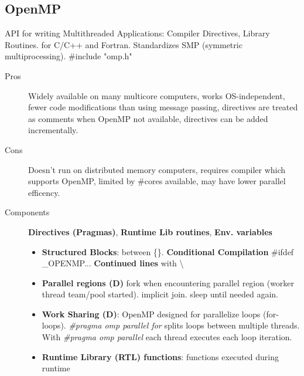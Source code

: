 \subsection*{OpenMP}
API for writing Multithreaded Applications: Compiler Directives, Library Routines. for C/C++ and Fortran. Standardizes SMP (symmetric multiprocessing). #include "omp.h"
\begin{description}
    \item[Pros] Widely available on many multicore computers, works OS-independent, fewer code modifications than using message passing, directives are treated as comments when OpenMP not available, directives can be added incrementally.
    \item[Cons] Doesn't run on distributed memory computers, requires compiler which supports OpenMP, limited by #cores available, may have lower parallel efficency.
    \item[Components]\textbf{Directives (Pragmas)}, \textbf{Runtime Lib routines}, \textbf{Env. variables} %
    \begin{itemize}
    \item \textbf{Structured Blocks}: between \{\}. \textbf{Conditional Compilation} #ifdef \_OPENMP... \textbf{Continued lines} with \textbackslash
        \item \textbf{Parallel regions (D)} fork when encountering parallel region (worker thread team/pool started). implicit join. sleep until needed again.
        \item \textbf{Work Sharing (D)}: OpenMP designed for parallelize loops (for-loops). \textit{\#pragma omp parallel for} splits loops between multiple threads. With \textit{\#pragma omp parallel} each thread executes each loop iteration.
        \item \textbf{Runtime Library (RTL) functions}: functions executed during runtime
    \end{itemize}
\end{description}
